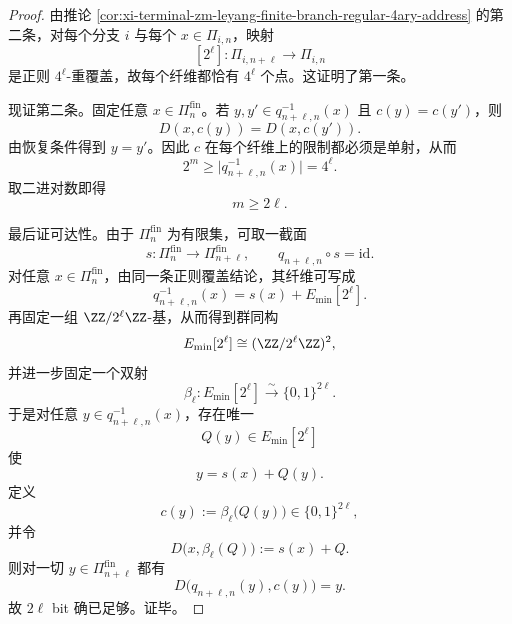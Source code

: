 \begin{proof}
由推论 \ref{cor:xi-terminal-zm-leyang-finite-branch-regular-4ary-address} 的第二条，对每个分支 \(i\) 与每个 \(x\in \Pi_{i,n}\)，映射
\[
[2^\ell]:\Pi_{i,n+\ell}\to \Pi_{i,n}
\]
是正则 \(4^\ell\)-重覆盖，故每个纤维都恰有 \(4^\ell\) 个点。这证明了第一条。

现证第二条。固定任意 \(x\in \Pi_n^{\mathrm{fin}}\)。若 \(y,y'\in q_{n+\ell,n}^{-1}(x)\) 且 \(c(y)=c(y')\)，则
\[
D(x,c(y))=D(x,c(y')).
\]
由恢复条件得到 \(y=y'\)。因此 \(c\) 在每个纤维上的限制都必须是单射，从而
\[
2^m\ge \bigl|q_{n+\ell,n}^{-1}(x)\bigr|=4^\ell.
\]
取二进对数即得
\[
m\ge 2\ell.
\]

最后证可达性。由于 \(\Pi_n^{\mathrm{fin}}\) 为有限集，可取一截面
\[
s:\Pi_n^{\mathrm{fin}}\to \Pi_{n+\ell}^{\mathrm{fin}},
\qquad
q_{n+\ell,n}\circ s=\mathrm{id}.
\]
对任意 \(x\in \Pi_n^{\mathrm{fin}}\)，由同一条正则覆盖结论，其纤维可写成
\[
q_{n+\ell,n}^{-1}(x)=s(x)+E_{\min}[2^\ell].
\]
再固定一组 \(\ZZ/2^\ell\ZZ\)-基，从而得到群同构
\[
E_{\min}[2^\ell]\cong (\ZZ/2^\ell\ZZ)^2,
\]
并进一步固定一个双射
\[
\beta_\ell:E_{\min}[2^\ell]\stackrel{\sim}{\longrightarrow}\{0,1\}^{2\ell}.
\]
于是对任意 \(y\in q_{n+\ell,n}^{-1}(x)\)，存在唯一
\[
Q(y)\in E_{\min}[2^\ell]
\]
使
\[
y=s(x)+Q(y).
\]
定义
\[
c(y):=\beta_\ell\bigl(Q(y)\bigr)\in\{0,1\}^{2\ell},
\]
并令
\[
D\bigl(x,\beta_\ell(Q)\bigr):=s(x)+Q.
\]
则对一切 \(y\in \Pi_{n+\ell}^{\mathrm{fin}}\) 都有
\[
D\bigl(q_{n+\ell,n}(y),c(y)\bigr)=y.
\]
故 \(2\ell\) bit 确已足够。证毕。
\end{proof}

